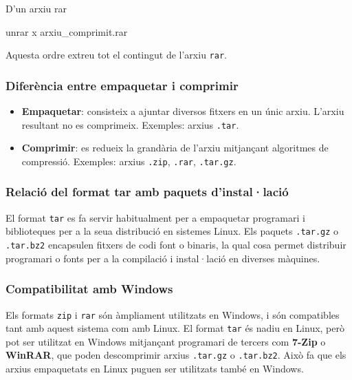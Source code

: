 \documentclass[
  12 pt,
  a4paper,
]{article}
\newenvironment{Shaded}{\begin{snugshade}}{\end{snugshade}}
\newcommand{\ExtensionTok}[1]{#1}
\newcommand{\NormalTok}[1]{#1}
\providecommand{\tightlist}{%
  \setlength{\itemsep}{0pt}\setlength{\parskip}{0pt}}
\begin{document}
D'un arxiu rar

\begin{Shaded}
\begin{Highlighting}[]
\ExtensionTok{unrar}\NormalTok{ x arxiu\_comprimit.rar}
\end{Highlighting}
\end{Shaded}

Aquesta ordre extreu tot el contingut de l'arxiu \texttt{rar}.

\subsubsection{Diferència entre empaquetar i
comprimir}\label{diferuxe8ncia-entre-empaquetar-i-comprimir}

\begin{itemize}
\tightlist
\item
  \textbf{Empaquetar}: consisteix a ajuntar diversos fitxers en un únic
  arxiu. L'arxiu resultant no es comprimeix. Exemples: arxius
  \texttt{.tar}.
\item
  \textbf{Comprimir}: es redueix la grandària de l'arxiu mitjançant
  algoritmes de compressió. Exemples: arxius \texttt{.zip},
  \texttt{.rar}, \texttt{.tar.gz}.
\end{itemize}

\subsubsection{Relació del format tar amb paquets
d'instal·lació}\label{relaciuxf3-del-format-tar-amb-paquets-dinstallaciuxf3}

El format \texttt{tar} es fa servir habitualment per a empaquetar
programari i biblioteques per a la seua distribució en sistemes Linux.
Els paquets \texttt{.tar.gz} o \texttt{.tar.bz2} encapsulen fitxers de
codi font o binaris, la qual cosa permet distribuir programari o fonts
per a la compilació i instal·lació en diverses màquines.

\subsubsection{Compatibilitat amb
Windows}\label{compatibilitat-amb-windows}

Els formats \texttt{zip} i \texttt{rar} són àmpliament utilitzats en
Windows, i són compatibles tant amb aquest sistema com amb Linux. El
format \texttt{tar} és nadiu en Linux, però pot ser utilitzat en Windows
mitjançant programari de tercers com \textbf{7-Zip} o \textbf{WinRAR},
que poden descomprimir arxius \texttt{.tar.gz} o \texttt{.tar.bz2}. Això
fa que els arxius empaquetats en Linux puguen ser utilitzats també en
Windows.
\end{document}
